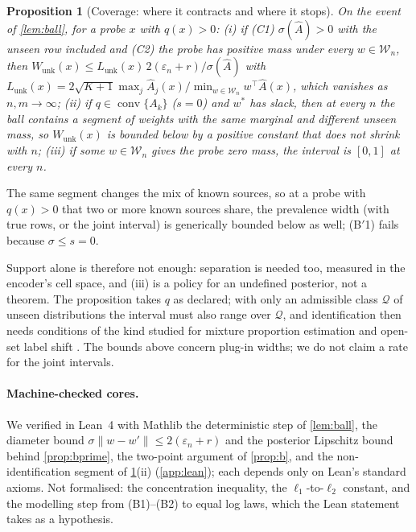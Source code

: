 \documentclass[twoside]{article}
\newcommand{\Wunk}{\ensuremath{W_{\mathrm{unk}}}}
\newtheorem{proposition}{Proposition}
\begin{document}
\begin{proposition}[Coverage: where it contracts and where it stops]
\label{prop:c}
On the event of \cref{lem:ball}, for a probe $x$ with $q(x)>0$:
(i) if (C1) $\sigma(\hat A)>0$ with the unseen row included and (C2) the probe has positive mass under
every $w\in\mathcal W_n$, then $\Wunk(x)\le L_{\mathrm{unk}}(x)\,2(\varepsilon_n+r)/\sigma(\hat A)$ with
$L_{\mathrm{unk}}(x)=2\sqrt{K+1}\max_{j}\hat A_j(x)/\min_{w\in\mathcal W_n}w^{\top}\hat A(x)$, which
vanishes as $n,m\to\infty$;
(ii) if $q\in\operatorname{conv}\{A_k\}$ ($s=0$) and $w^{*}$ has slack, then at every $n$ the ball
contains a segment of weights with the same marginal and different unseen mass, so $\Wunk(x)$ is
bounded below by a positive constant that does not shrink with $n$;
(iii) if some $w\in\mathcal W_n$ gives the probe zero mass, the interval is $[0,1]$ at every $n$.
\end{proposition}

The same segment changes the mix of known sources, so at a probe with $q(x)>0$ that two or more known
sources share, the prevalence width (with true rows, or the joint interval) is generically bounded below
as well; (B$'$1) fails because $\sigma\le s=0$.

Support alone is therefore not enough: separation is needed too, measured in the encoder's cell
space, and (iii) is a policy for an undefined posterior, not a theorem. The proposition takes $q$ as
declared; with only an admissible class $\mathcal Q$ of unseen distributions the interval must also
range over $\mathcal Q$, and identification then needs conditions of the kind studied for mixture
proportion estimation and open-set label shift \citep{ramaswamy2016mixture,garg2022domain}. The
bounds above concern plug-in widths; we do not claim a rate for the joint intervals.

\paragraph{Machine-checked cores.} We verified in Lean~4 with Mathlib the deterministic step of
\cref{lem:ball}, the diameter bound $\sigma\lVert w-w'\rVert\le2(\varepsilon_n+r)$ and the posterior
Lipschitz bound behind \cref{prop:bprime}, the two-point argument of \cref{prop:b}, and the
non-identification segment of \cref{prop:c}(ii) (\cref{app:lean}); each depends only on Lean's
standard axioms. Not formalised: the concentration inequality, the $\ell_1$-to-$\ell_2$ constant, and
the modelling step from (B1)--(B2) to equal log laws, which the Lean statement takes as a hypothesis.
\end{document}
